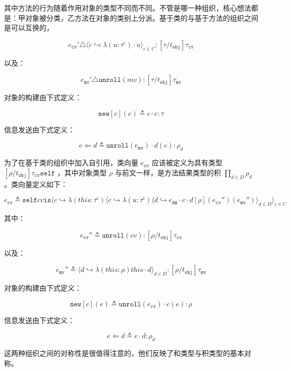 其中方法的行为随着作用对象的类型不同而不同。不管是哪一种组织，核心想法都是：甲对象被分类，乙方法在对象的类别上分派。基于类的与基于方法的组织之间是可以互换的，

$$ e_{\mathtt{cv}}' \triangle \langle c \hookrightarrow \lambda(u : \tau^{c}) \cdot u \rangle_{c \in C} : [\tau / t_{\mathtt{obj}}]\tau_{\mathtt{cv}}$$

以及：

$$ e_{\mathtt{mv}}' \triangle {\mathtt{unroll}}(mv) : [\tau/t_{\mathtt{obj}}]\tau_{\mathtt{mv}}$$

对象的构建由下式定义：

$$ {\mathtt{new}}[c](e) \triangleq c \cdot e : \tau $$

信息发送由下式定义：

$$ e \Leftarrow d \triangleq {\mathtt{unroll}}(e_{\mathtt{mv}}) \cdot d(e) : \rho_{d} $$

为了在基于类的组织中加入自引用，类向量 $e_{\mathtt{cv}}$ 应该被定义为具有类型 $[\rho/t_{\mathtt{obj}}]\tau_{\mathtt{cv}} {\mathtt{self}}$ ，其中对象类型 $\rho$ 与前文一样，是方法结果类型的积 $\prod_{d \in D} \rho_{d}$。类向量定义如下：

$$ e_{\mathtt{cv}} \triangleq {\mathtt{self}} cv {\mathtt{is}} \langle c \hookrightarrow \lambda(this : \tau^{c}) \langle c \hookrightarrow \lambda (u : \tau^{c}) \langle d \hookrightarrow e_{\mathtt{dm}} \cdot c \cdot d[\rho] (e_{\mathtt{cv}}'')(e_{\mathtt{mv}}'')\rangle_{d \in D} \rangle_{c \in C}$$

其中：

$$ e_{\mathtt{cv}}'' \triangleq {\mathtt{unroll}}(cv):[\rho/t_{\mathtt{obj}}]\tau_{\mathtt{cv}} $$

以及：

$$ e_{\mathtt{mv}}'' \triangleq \langle d \hookrightarrow \lambda (this : \rho) this \cdot d  \rangle_{d \in D} : [\rho/t_{\mathtt{obj}}]\tau_{\mathtt{mv}} $$

对象的构建由下式定义：

$$ \mathtt{new}[c](e) \triangleq \mathtt{unroll} (e_{\mathtt{cv}}) \cdot c(e) : \rho $$

信息发送由下式定义：

$$ e \Leftarrow d \triangleq e \cdot d : \rho_{d} $$

这两种组织之间的对称性是很值得注意的，他们反映了和类型与积类型的基本对称。
